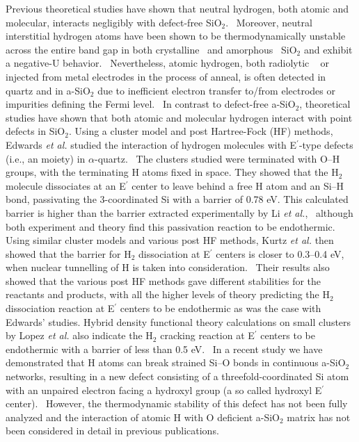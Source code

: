 \documentclass[aps,prb,reprint,superscriptaddress,showpacs]{revtex4-1}
\begin{document}
Previous theoretical studies have shown that neutral hydrogen, both atomic and molecular, interacts negligibly with defect-free SiO$_2$.~\cite{blochl_vacancies,yokozawa_h} Moreover, neutral interstitial hydrogen atoms have been shown to be thermodynamically unstable across the entire band gap in both crystalline~\cite{blochl_vacancies} and amorphous~\cite{godet_hydrogen} SiO$_2$ and exhibit a negative-U behavior.~\cite{godet_hydrogen,robertson_oxides} Nevertheless, atomic hydrogen, both radiolytic ~\cite{griscom_hydrogen} or injected from metal electrodes in the process of anneal, is often detected in quartz and in a-SiO$_2$ due to inefficient electron transfer to/from electrodes or impurities defining the Fermi level.~\cite{griscom_hydrogen} In contrast to defect-free a-SiO$_2$, theoretical studies have shown that both atomic and molecular hydrogen interact with point defects in SiO$_2$. Using a cluster model and post Hartree-Fock (HF) methods, Edwards \emph{et al.} studied the interaction of hydrogen molecules with E$^\prime$-type defects (i.e., an \setatomsep{2em}\hspace{2 pt} moiety) in $\alpha$-quartz.~\cite{edwards_h2} The clusters studied were terminated with O--H groups, with the terminating H atoms fixed in space. They showed that the H$_2$ molecule dissociates at an E$^\prime$ center to leave behind a free H atom and an Si--H bond, passivating the 3-coordinated Si with a barrier of 0.78 eV. This calculated barrier is higher than the barrier extracted experimentally by Li \emph {et al.},~\cite{h2crack_li} although both experiment and theory find this passivation reaction to be endothermic. Using similar cluster models and various post HF methods, Kurtz \emph{et al.} then showed that the barrier for H$_2$ dissociation at E$^\prime$ centers is closer to 0.3--0.4 eV, when nuclear tunnelling of H is taken into consideration.~\cite{kurtz_h2} Their results also showed that the various post HF methods gave different stabilities for the reactants and products, with all the higher levels of theory predicting the H$_2$ dissociation reaction at E$^\prime$ centers to be endothermic as was the case with Edwards' studies. Hybrid density functional theory calculations on small clusters by Lopez \emph{et al.} also indicate the H$_2$ cracking reaction at E$^\prime$ centers to be endothermic with a barrier of less than 0.5 eV.~\cite{h2crack_sidb_ts} In a recent study we have demonstrated that H atoms can break strained \mbox{Si--O} bonds in continuous a-SiO$_2$ networks, resulting in a new defect consisting of a threefold-coordinated Si atom with an unpaired electron facing a hydroxyl group (a so called hydroxyl E$^\prime$ center).~\cite{aelsayed_prl} However, the thermodynamic stability of this defect has not been fully analyzed and the interaction of atomic H with O deficient a-SiO$_2$ matrix has not been considered in detail in previous publications.
\end{document}
